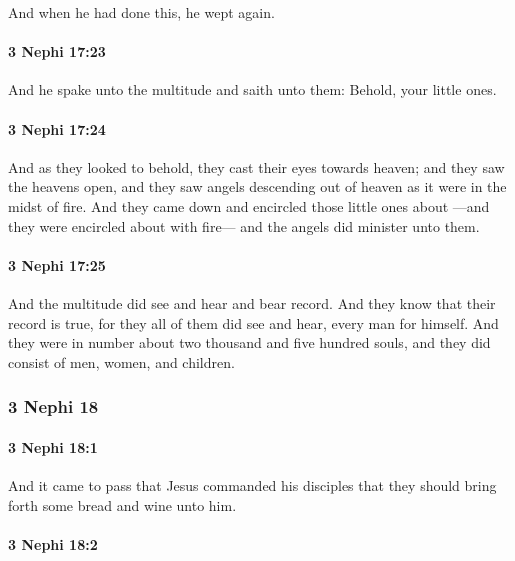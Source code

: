 			And when he had done this, he wept again.

		\paragraph{3 Nephi 17:23} %
			\label{3NEPHI-17-23}

			And he spake unto the multitude and saith unto them:
			Behold, your little ones.

		\paragraph{3 Nephi 17:24} %
			\label{3NEPHI-17-24}

			And as they looked to behold,
			they cast their eyes towards heaven;
			and they saw the heavens open,
			and they saw angels descending out of heaven
			as it were in the midst of fire.
			And they came down and encircled those little ones about
			---and they were encircled about with fire---
			and the angels did minister unto them.

		\paragraph{3 Nephi 17:25} %
			\label{3NEPHI-17-25}

			And the multitude did see and hear and bear record.
			And they know that their record is true,
			for they all of them did see and hear, every man for himself.
			And they were in number about two thousand and five hundred souls,
			and they did consist of men, women, and children.

	\subsubsection{3 Nephi 18} %
		\label{3NEPHI-18}
		
		\paragraph{3 Nephi 18:1} %
			\label{3NEPHI-18-1}

			And it came to pass that Jesus commanded his disciples
			that they should bring forth some bread and wine unto him.

		\paragraph{3 Nephi 18:2} %
			\label{3NEPHI-18-2}


